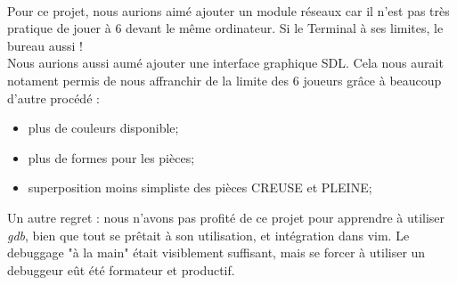 \documentclass{report}
\begin{document}
    \paragraph*{} %
     Pour ce projet, nous aurions aimé ajouter un module réseaux car il n'est pas très pratique de jouer à 6 devant le même ordinateur. Si le Terminal à ses limites, le bureau aussi !\\
     Nous aurions aussi aumé ajouter une interface graphique SDL. Cela nous aurait notament permis de nous affranchir de la limite des 6 joueurs grâce à beaucoup d'autre procédé : \\
     \begin{itemize}
     	\item plus de couleurs disponible;
	\item plus de formes pour les pièces;
	\item superposition moins simpliste des pièces CREUSE et PLEINE;
     \end{itemize}
     Un autre regret : nous n'avons pas profité de ce projet pour apprendre à utiliser \textit{gdb}, bien que tout se prêtait à son utilisation, et intégration dans vim. 
        Le debuggage "à la main" était visiblement suffisant, mais se forcer à utiliser un debuggeur eût été formateur et productif.
    \newpage
\end{document}
